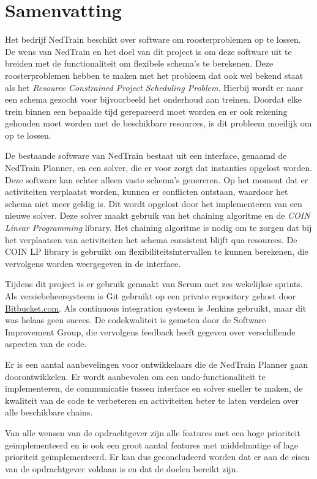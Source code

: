 \section*{Samenvatting}
Het bedrijf NedTrain beschikt over software om roosterproblemen op te lossen. De wens van NedTrain en het doel van dit project is om deze software uit te breiden met de functionaliteit om flexibele schema's te berekenen. Deze roosterproblemen hebben te maken met het probleem dat ook wel bekend staat als het \emph{Resource Constrained Project Scheduling Problem}. Hierbij wordt er naar een schema gezocht voor bijvoorbeeld het onderhoud aan treinen. Doordat elke trein binnen een bepaalde tijd gerepareerd moet worden en er ook rekening gehouden moet worden met de beschikbare resources, is dit probleem moeilijk om op te lossen.

De bestaande software van NedTrain bestaat uit een interface, genaamd de NedTrain Planner, en een solver, die er voor zorgt dat instanties opgelost worden. Deze software kan echter alleen vaste schema's genereren. Op het moment dat er activiteiten verplaatst worden, kunnen er conflicten ontstaan, waardoor het schema niet meer geldig is. Dit wordt opgelost door het implementeren van een nieuwe solver. Deze solver maakt gebruik van het chaining algoritme en de \emph{COIN Linear Programming} library. Het chaining algoritme is nodig om te zorgen dat bij het verplaatsen van activiteiten het schema consistent blijft qua resources. De COIN LP library is gebruikt om flexibiliteitsintervallen te kunnen berekenen, die vervolgens worden weergegeven in de interface. 

Tijdens dit project is er gebruik gemaakt van Scrum met zes wekelijkse sprints. Als versiebeheersysteem is Git gebruikt op een private repository gehost door \href{http://bitbucket.com}{Bitbucket.com}. Als continuous integration systeem is Jenkins gebruikt, maar dit was helaas geen succes. De codekwaliteit is gemeten door de Software Improvement Group, die vervolgens feedback heeft gegeven over verschillende aspecten van de code. 

Er is een aantal aanbevelingen voor ontwikkelaars die de NedTrain Planner gaan doorontwikkelen. Er wordt aanbevolen om een undo-functionaliteit te implementeren, de communicatie tussen interface en solver sneller te maken, de kwaliteit van de code te verbeteren en activiteiten beter te laten verdelen over alle beschikbare chains.

Van alle wensen van de opdrachtgever zijn alle features met een hoge prioriteit ge\"implementeerd en is ook een groot aantal features met middelmatige of lage prioriteit ge\"implementeerd. Er kan dus geconcludeerd worden dat er aan de eisen van de opdrachtgever voldaan is en dat de doelen bereikt zijn.

